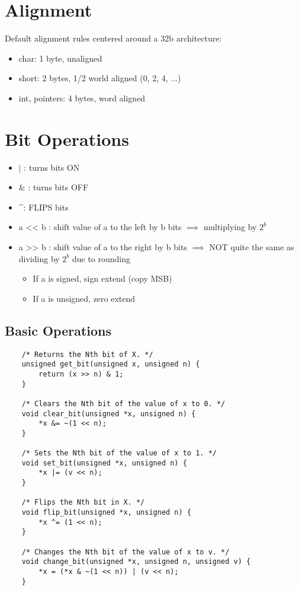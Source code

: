 \section{Alignment}
Default alignment rules centered around a 32b architecture:
\begin{itemize}
    \item char: 1 byte, unaligned
    \item short: 2 bytes, 1/2 world aligned (0, 2, 4, ...)
    \item int, pointers: 4 bytes, word aligned
\end{itemize}

\section{Bit Operations}
\begin{itemize}
    \item \(\mid\) : turns bits ON
    \item \& : turns bits OFF
    \item \^ \space \space: FLIPS bits
    \item a << b : shift value of a to the left by b bits \(\implies\) multiplying by \(2^b\)
    \item a >> b : shift value of a to the right by b bits \(\implies\) NOT quite the same as dividing by \(2^b\) due to rounding
    \begin{itemize}
        \item If a is signed, sign extend (copy MSB)
        \item If a is unsigned, zero extend
    \end{itemize}
\end{itemize}

\subsection{Basic Operations}
\begin{verbatim}
    /* Returns the Nth bit of X. */
    unsigned get_bit(unsigned x, unsigned n) {
        return (x >> n) & 1;
    }
    
    /* Clears the Nth bit of the value of x to 0. */
    void clear_bit(unsigned *x, unsigned n) {
        *x &= ~(1 << n);
    }
    
    /* Sets the Nth bit of the value of x to 1. */
    void set_bit(unsigned *x, unsigned n) {
        *x |= (v << n);
    }
    
    /* Flips the Nth bit in X. */
    void flip_bit(unsigned *x, unsigned n) {
        *x ^= (1 << n);
    }
    
    /* Changes the Nth bit of the value of x to v. */
    void change_bit(unsigned *x, unsigned n, unsigned v) {
        *x = (*x & ~(1 << n)) | (v << n);
    }
\end{verbatim}